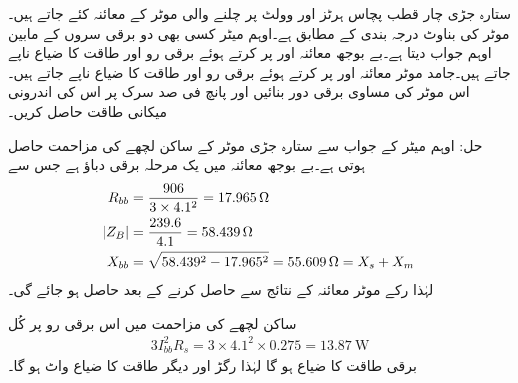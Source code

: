 ستارہ جڑی چار قطب پچاس ہرٹز اور  وولٹ پر چلنے والی موٹر کے معائنہ کئے جاتے ہیں۔ موٹر کی بناوٹ درجہ بندی   کے مطابق ہے۔اوہم میٹر کسی بھی دو برقی سروں کے مابین  اوہم جواب دیتا ہے۔بے بوجھ معائنہ  اور  پر کرتے ہوئے برقی رو  اور طاقت کا ضیاع  ناپے جاتے ہیں۔جامد موٹر معائنہ   اور  پر کرتے ہوئے برقی رو  اور طاقت کا ضیاع  ناپے جاتے ہیں۔اس موٹر کی مساوی برقی دور بنائیں اور پانچ فی صد سرک پر اس کی اندرونی میکانی طاقت حاصل کریں۔

حل:
	اوہم میٹر کے جواب سے  ستارہ جڑی موٹر کے ساکن لچھے کی مزاحمت  حاصل ہوتی ہے۔بے بوجھ معائنہ میں یک مرحلہ برقی دباؤ  ہے جس سے
\begin{align*}
R_{bb} &=\frac{906}{3 \times 4.1^2}=\SI{17.965}{\ohm}\\
\abs{Z_B}&=\frac{239.6}{4.1}=\SI{58.439}{\ohm}\\
X_{bb}&=\sqrt{58.439^2-17.965^2}=\SI{55.609}{\ohm}=X_s+X_m
\end{align*}
لہٰذا  رکے موٹر معائنہ کے نتائج سے  حاصل کرنے کے بعد  حاصل ہو جائے گی۔

ساکن لچھے کی مزاحمت میں اس برقی رو پر کُل
\begin{align*}
3 I_{bb}^2 R_s=3 \times 4.1^2 \times  0.275=\SI{13.87}{\watt}
\end{align*}
برقی طاقت کا ضیاع ہو گا لہٰذا رگڑ اور دیگر طاقت کا ضیاع  واٹ ہو گا۔

